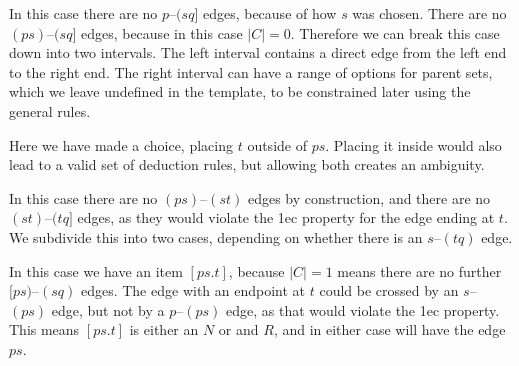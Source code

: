 In this case there are no $p$--$(sq]$ edges, because of how $s$ was chosen.
There are no $(ps)$--$(sq]$ edges, because in this case $|C| = 0$.
Therefore we can break this case down into two intervals.
The left interval contains a direct edge from the left end to the right end.
The right interval can have a range of options for parent sets, which we leave undefined in the template, to be constrained later using the general rules.


\begin{center}
\end{center}

Here we have made a choice, placing $t$ outside of $ps$.
Placing it inside would also lead to a valid set of deduction rules, but allowing both creates an ambiguity.

In this case there are no $(ps)$--$(st)$ edges by construction, and there are no $(st)$--$(tq]$ edges, as they would violate the 1ec property for the edge ending at $t$.
We subdivide this into two cases, depending on whether there is an $s$--$(tq)$ edge.

\begin{center}
\end{center}

In this case we have an item $[ps.t]$, because $|C| = 1$ means there are no further $[ps)$--$(sq)$ edges.
The edge with an endpoint at $t$ could be crossed by an $s$--$(ps)$ edge, but not by a $p$--$(ps)$ edge, as that would violate the 1ec property.
This means $[ps.t]$ is either an $N$ or and $R$, and in either case will have the edge $ps$.

